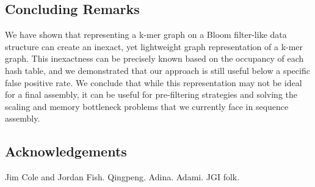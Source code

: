 \documentclass[12pt]{article} \usepackage{simplemargins}
\begin{document}
\subsection{Concluding Remarks}
We have shown that representing a k-mer graph on a Bloom filter-like data 
structure can create an inexact, yet lightweight graph representation of 
a k-mer graph. This inexactness can be precisely known based on the occupancy 
of each hash table, and we demonstrated that our approach is still useful 
below a specific false positive rate. We conclude that while this representation 
may not be ideal for a final assembly, it can be useful for pre-filtering 
strategies and solving the scaling and memory bottleneck problems that we 
currently face in sequence assembly.

\subsection{Acknowledgements}

Jim Cole and Jordan Fish.  Qingpeng.  Adina.  Adami.  JGI folk.



\end{document}
